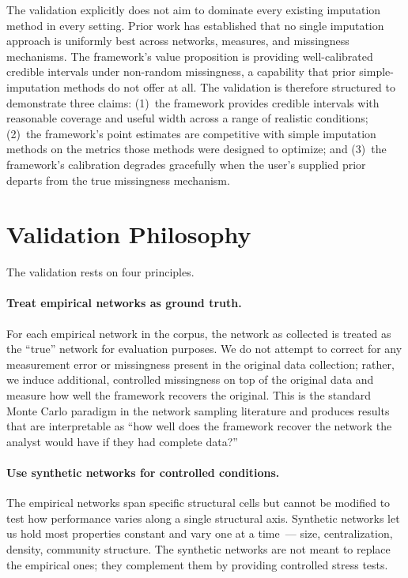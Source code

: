 \documentclass[11pt]{article}
\begin{document}
The validation explicitly does not aim to dominate every existing imputation method in every setting. Prior work \citep{SmithMorganMoody2022} has established that no single imputation approach is uniformly best across networks, measures, and missingness mechanisms. The framework's value proposition is providing well-calibrated credible intervals under non-random missingness, a capability that prior simple-imputation methods do not offer at all. The validation is therefore structured to demonstrate three claims: (1)~the framework provides credible intervals with reasonable coverage and useful width across a range of realistic conditions; (2)~the framework's point estimates are competitive with simple imputation methods on the metrics those methods were designed to optimize; and (3)~the framework's calibration degrades gracefully when the user's supplied prior departs from the true missingness mechanism.

\section{Validation Philosophy}

The validation rests on four principles.

\paragraph{Treat empirical networks as ground truth.} For each empirical network in the corpus, the network as collected is treated as the ``true'' network for evaluation purposes. We do not attempt to correct for any measurement error or missingness present in the original data collection; rather, we induce additional, controlled missingness on top of the original data and measure how well the framework recovers the original. This is the standard Monte Carlo paradigm in the network sampling literature \citep[see][]{SmithMorganMoody2022} and produces results that are interpretable as ``how well does the framework recover the network the analyst would have if they had complete data?''

\paragraph{Use synthetic networks for controlled conditions.} The empirical networks span specific structural cells but cannot be modified to test how performance varies along a single structural axis. Synthetic networks let us hold most properties constant and vary one at a time~--- size, centralization, density, community structure. The synthetic networks are not meant to replace the empirical ones; they complement them by providing controlled stress tests.
\end{document}
